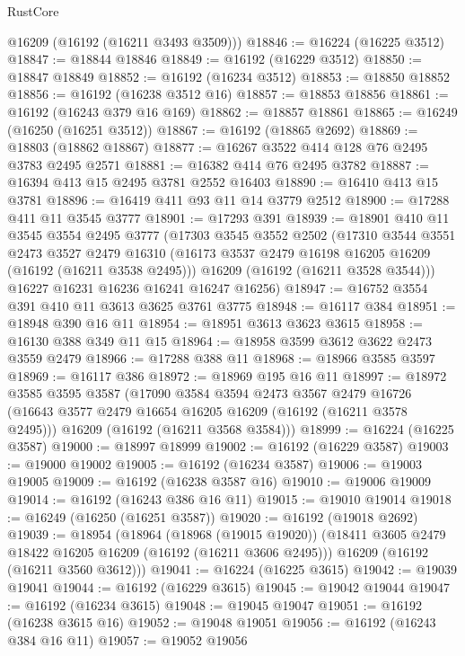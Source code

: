 \begin{lexlean}{RustCore}
\begin{coremodule}
      @16209
      (@16192 (@16211 @3493 @3509)))
@18846 := @16224 (@16225 @3512)
@18847 := @18844 @18846
@18849 := @16192 (@16229 @3512)
@18850 := @18847 @18849
@18852 := @16192 (@16234 @3512)
@18853 := @18850 @18852
@18856 := @16192 (@16238 @3512 @16)
@18857 := @18853 @18856
@18861 := @16192 (@16243 @379 @16 @169)
@18862 := @18857 @18861
@18865 := @16249 (@16250 (@16251 @3512))
@18867 := @16192 (@18865 @2692)
@18869 := @18803 (@18862 @18867)
@18877 := @16267 @3522 @414 @128 @76 @2495 @3783 @2495 @2571
@18881 := @16382 @414 @76 @2495 @3782
@18887 := @16394 @413 @15 @2495 @3781 @2552 @16403
@18890 := @16410 @413 @15 @3781
@18896 := @16419 @411 @93 @11 @14 @3779 @2512
@18900 := @17288 @411 @11 @3545 @3777
@18901 := @17293 @391
@18939 := @18901
    @410
    @11
    @3545
    @3554
    @2495
    @3777
    (@17303
      @3545
      @3552
      @2502
      (@17310
        @3544
        @3551
        @2473
        @3527
        @2479
        @16310
        (@16173 @3537 @2479 @16198 @16205 @16209 (@16192 (@16211 @3538 @2495)))
        @16209
        (@16192 (@16211 @3528 @3544)))
      @16227
      @16231
      @16236
      @16241
      @16247
      @16256)
@18947 := @16752 @3554 @391 @410 @11 @3613 @3625 @3761 @3775
@18948 := @16117 @384
@18951 := @18948 @390 @16 @11
@18954 := @18951 @3613 @3623 @3615
@18958 := @16130 @388 @349 @11 @15
@18964 := @18958 @3599 @3612 @3622 @2473 @3559 @2479
@18966 := @17288 @388 @11
@18968 := @18966 @3585 @3597
@18969 := @16117 @386
@18972 := @18969 @195 @16 @11
@18997 := @18972
    @3585
    @3595
    @3587
    (@17090
      @3584
      @3594
      @2473
      @3567
      @2479
      @16726
      (@16643 @3577 @2479 @16654 @16205 @16209 (@16192 (@16211 @3578 @2495)))
      @16209
      (@16192 (@16211 @3568 @3584)))
@18999 := @16224 (@16225 @3587)
@19000 := @18997 @18999
@19002 := @16192 (@16229 @3587)
@19003 := @19000 @19002
@19005 := @16192 (@16234 @3587)
@19006 := @19003 @19005
@19009 := @16192 (@16238 @3587 @16)
@19010 := @19006 @19009
@19014 := @16192 (@16243 @386 @16 @11)
@19015 := @19010 @19014
@19018 := @16249 (@16250 (@16251 @3587))
@19020 := @16192 (@19018 @2692)
@19039 := @18954
    (@18964
      (@18968 (@19015 @19020))
      (@18411 @3605 @2479 @18422 @16205 @16209 (@16192 (@16211 @3606 @2495)))
      @16209
      (@16192 (@16211 @3560 @3612)))
@19041 := @16224 (@16225 @3615)
@19042 := @19039 @19041
@19044 := @16192 (@16229 @3615)
@19045 := @19042 @19044
@19047 := @16192 (@16234 @3615)
@19048 := @19045 @19047
@19051 := @16192 (@16238 @3615 @16)
@19052 := @19048 @19051
@19056 := @16192 (@16243 @384 @16 @11)
@19057 := @19052 @19056

\end{coremodule}
\end{lexlean}
